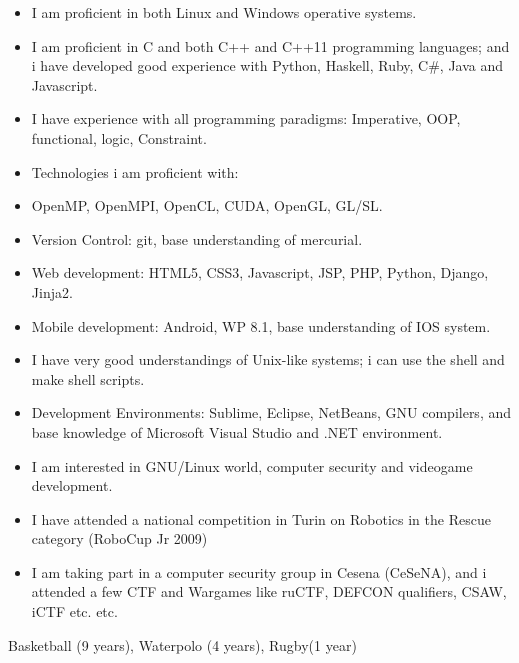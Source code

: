 \documentclass[helvetica,narrow,openbib,notitle,flagCMYK]{europecv}
\begin{document}
\begin{europecv}
	 {
		\begin{itemize}
			\item I am proficient in both Linux and Windows operative systems.
			\item I am proficient in C and both C++ and C++11 programming languages; and i have developed good experience with Python, Haskell, Ruby, C\#, Java and Javascript.
			\item I have experience with all programming paradigms: Imperative, OOP, functional, logic, Constraint.
			\item Technologies i am proficient with:
			\item OpenMP, OpenMPI, OpenCL, CUDA, OpenGL, GL/SL.
			\item Version Control: git, base understanding of mercurial.
			\item Web development: HTML5, CSS3, Javascript, JSP, PHP, Python, Django, Jinja2.
			\item Mobile development: Android, WP 8.1, base understanding of IOS system.
			\item I have very good understandings of Unix-like systems; i can use the shell and make shell scripts.
			\item Development Environments: Sublime, Eclipse, NetBeans, GNU compilers, and base knowledge of Microsoft Visual Studio and .NET environment.
		\end{itemize}
	}
	 {
		\begin{itemize}
			\item I am interested in GNU/Linux world, computer security and videogame development. 
			\item I have attended a national competition in Turin on Robotics in the Rescue category (RoboCup Jr 2009) 
			\item I am taking part in a computer security group in Cesena (CeSeNA), and i attended a few CTF and Wargames like ruCTF, DEFCON qualifiers, CSAW, iCTF etc. etc.
		\end{itemize}
	}
	 {Basketball (9 years), Waterpolo (4 years), Rugby(1 year)}


	\end{europecv}
\end{document}
